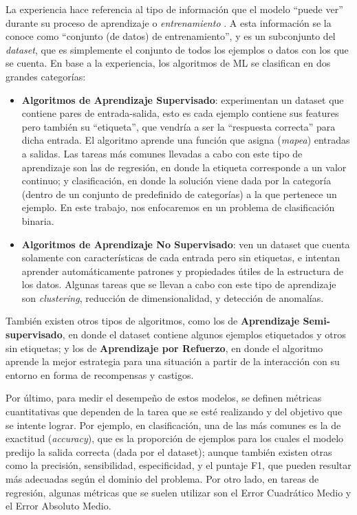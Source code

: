 \documentclass[../../main.tex]{subfiles}
\begin{document}
La experiencia hace referencia al tipo de información que el modelo ``puede ver'' durante su proceso de aprendizaje o \textit{entrenamiento} \cite{hands-on-ML-sklearn-tf}. A esta información se la conoce como ``conjunto (de datos) de entrenamiento'', y es un subconjunto del \textit{dataset}, que es simplemente el conjunto de todos los ejemplos o datos con los que se cuenta. En base a la experiencia, los algoritmos de ML se clasifican en dos grandes categorías:
\begin{itemize}
    \item \textbf{Algoritmos de Aprendizaje Supervisado}: experimentan un dataset que contiene pares de entrada-salida, esto es cada ejemplo contiene sus features pero también su ``etiqueta'', que vendría a ser la ``respuesta correcta'' para dicha entrada. El algoritmo aprende una función que asigna (\textit{mapea}) entradas a salidas. Las tareas más comunes llevadas a cabo con este tipo de aprendizaje son las de regresión, en donde la etiqueta corresponde a un valor continuo; y clasificación, en donde la solución viene dada por la categoría (dentro de un conjunto de predefinido de categorías) a la que pertenece un ejemplo. En este trabajo, nos enfocaremos en un problema de clasificación binaria.
    \item \textbf{Algoritmos de Aprendizaje No Supervisado}: ven un dataset que cuenta solamente con características de cada entrada pero sin etiquetas, e intentan aprender automáticamente patrones y propiedades útiles de la estructura de los datos. Algunas tareas que se llevan a cabo con este tipo de aprendizaje son \textit{clustering}, reducción de dimensionalidad, y detección de anomalías.
\end{itemize}
También existen otros tipos de algoritmos, como los de \textbf{Aprendizaje Semi-supervisado}, en donde el dataset contiene algunos ejemplos etiquetados y otros sin etiquetas; y los de \textbf{Aprendizaje por Refuerzo}, en donde el algoritmo aprende la mejor estrategia para una situación a partir de la interacción con su entorno en forma de recompensas y castigos.

Por último, para medir el desempeño de estos modelos, se definen métricas cuantitativas que dependen de la tarea que se esté realizando y del objetivo que se intente lograr. Por ejemplo, en clasificación, una de las más comunes es la de exactitud (\textit{accuracy}), que es la proporción de ejemplos para los cuales el modelo predijo la salida correcta (dada por el dataset); aunque también existen otras como la precisión, sensibilidad, especificidad, y el puntaje F1, que pueden resultar más adecuadas según el dominio del problema. Por otro lado, en tareas de regresión, algunas métricas que se suelen utilizar son el Error Cuadrático Medio y el Error Absoluto Medio. 
\end{document}

